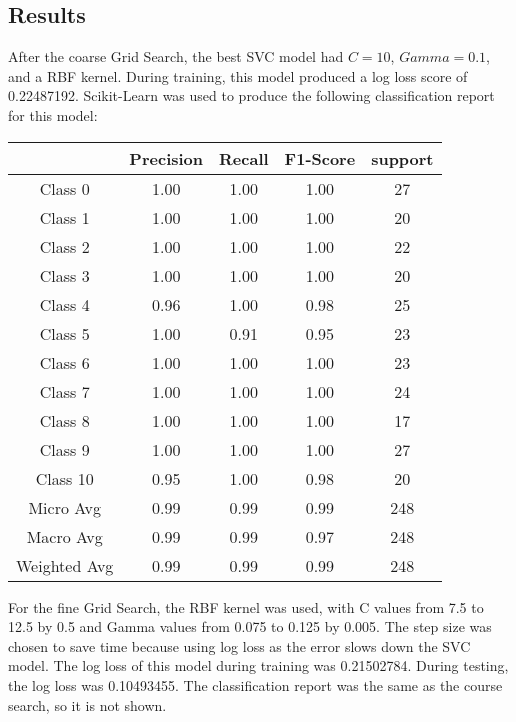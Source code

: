 \documentclass[12pt]{article}
\begin{document}
    \subsection{Results}
    After the coarse Grid Search, the best SVC model had $C = 10$, $Gamma = 0.1$, and a RBF kernel. During training, this model produced a log loss score of 0.22487192. Scikit-Learn was used to produce the following classification report for this model:
    \begin{center}
    	\begin{tabular}{| c | c | c | c | c |}
    		\hline
    		& Precision & Recall & F1-Score & support \\ \hline
    		Class 0 & 1.00 & 1.00 & 1.00 & 27 \\ \hline
    		Class 1 & 1.00 & 1.00 & 1.00 & 20 \\ \hline
    		Class 2 & 1.00 & 1.00 & 1.00 & 22 \\ \hline
    		Class 3 & 1.00 & 1.00 & 1.00 & 20 \\ \hline
    		Class 4 & 0.96 & 1.00 & 0.98 & 25 \\ \hline
    		Class 5 & 1.00 & 0.91 & 0.95 & 23 \\ \hline
    		Class 6 & 1.00 & 1.00 & 1.00 & 23 \\ \hline
    		Class 7 & 1.00 & 1.00 & 1.00 & 24 \\ \hline
    		Class 8 & 1.00 & 1.00 & 1.00 & 17 \\ \hline
    		Class 9 & 1.00 & 1.00 & 1.00 & 27 \\ \hline
    		Class 10 & 0.95 & 1.00 & 0.98 & 20 \\ \hline
    		Micro Avg & 0.99 & 0.99 & 0.99 & 248 \\ \hline
    		Macro Avg & 0.99 & 0.99 & 0.97 & 248 \\ \hline
    		Weighted Avg & 0.99 & 0.99 & 0.99 & 248 \\ \hline
    	\end{tabular}
    \end{center}
    For the fine Grid Search, the RBF kernel was used, with C values from 7.5 to 12.5 by 0.5 and Gamma values from 0.075 to 0.125 by 0.005. The step size was chosen to save time because using log loss as the error slows down the SVC model. The log loss of this model during training was 0.21502784. During testing, the log loss was 0.10493455. The classification report was the same as the course search, so it is not shown.
	
\end{document}
